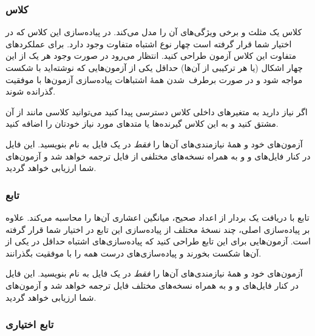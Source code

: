 \documentclass{utap}
\begin{document}
    \subsubsection[کلاس Triangle]{کلاس }

    کلاس  یک مثلث و برخی ویژگی‌های آن را مدل می‌کند.
    در پیاده‌سازی این کلاس که در اختیار شما قرار گرفته است چهار نوع اشتباه متفاوت وجود دارد. برای عملکردهای متفاوت این کلاس آزمون طراحی کنید. انتظار می‌رود در صورت وجود هر یک از این چهار اشکال (یا هر ترکیبی از آن‌ها) حداقل یکی از آزمون‌هایی که نوشته‌اید با شکست مواجه شود و در صورت برطرف~شدن همهٔ اشتباهات پیاده‌سازی آزمون‌ها با موفقیت گذرانده شوند.

    اگر نیاز دارید به متغیرهای داخلی کلاس  دسترسی پیدا کنید می‌توانید کلاسی مانند  از آن مشتق کنید و به این کلاس گیرنده‌ها یا متدهای مورد نیاز خودتان را اضافه کنید.

    آزمون‌های خود و همهٔ نیازمندی‌های آن‌ها را \textit{فقط} در یک فایل به نام  بنویسید. این فایل در کنار فایل‌های  و  و به همراه نسخه‌های مختلفی از فایل  ترجمه خواهد شد و آزمون‌های شما ارزیابی خواهد گردید.
    
    \subsubsection[تابع get\_avg\_of\_vector]{تابع }

    تابع  با دریافت یک بردار از اعداد صحیح، میانگین اعشاری آن‌ها را محاسبه می‌کند.
    علاوه بر پیاده‌سازی اصلی، چند نسخهٔ مختلف از پیاده‌سازی این تابع در اختیار شما قرار گرفته است. آزمون‌هایی برای این تابع طراحی کنید که پیاده‌سازی‌های اشتباه حداقل در یکی از آن‌ها شکست بخورند و پیاده‌سازی‌های درست همه را با موفقیت بگذرانند.

    آزمون‌های خود و همهٔ نیازمندی‌های آن‌ها را \textit{فقط} در یک فایل به نام  بنویسید. این فایل در کنار فایل‌های  و  و به همراه نسخه‌های مختلف فایل  ترجمه خواهد شد و آزمون‌های شما ارزیابی خواهد گردید.

    \subsubsection[تابع satisfies\_hailstone]{تابع \hfill\normalsize\mdseries اختیاری}
\end{document}
